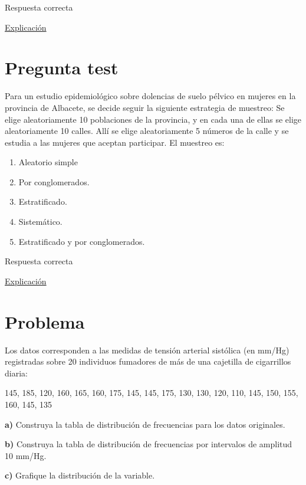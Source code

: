 \documentclass[
]{book}
\providecommand{\tightlist}{%
  \setlength{\itemsep}{0pt}\setlength{\parskip}{0pt}}
\begin{document}
Respuesta correcta

\href{https://es.wikipedia.org/wiki/Estudio_de_cohorte}{Explicación}

\hypertarget{pregunta-test-23}{%
\section{Pregunta test}\label{pregunta-test-23}}

Para un estudio epidemiológico sobre dolencias de suelo pélvico en mujeres en la provincia de Albacete, se decide seguir la siguiente estrategia de muestreo: Se elige aleatoriamente 10 poblaciones de la provincia, y en cada una de ellas se elige aleatoriamente 10 calles. Allí se elige aleatoriamente 5 números de la calle y se estudia a las mujeres que aceptan participar. El muestreo es:

\begin{enumerate}
\def\labelenumi{\alph{enumi})}
\tightlist
\item
  Aleatorio simple
\item
  Por conglomerados.
\item
  Estratificado.
\item
  Sistemático.
\item
  Estratificado y por conglomerados.
\end{enumerate}

Respuesta correcta

\href{https://1fjmanzano.github.io/bioestadistica/me\%CC\%81todos-de-muestreo.html}{Explicación}

\hypertarget{problema-4}{%
\section{Problema}\label{problema-4}}

Los datos corresponden a las medidas de tensión arterial sistólica (en mm/Hg) registradas sobre 20 individuos fumadores de más de una cajetilla de cigarrillos diaria:

145, 185, 120, 160, 165, 160, 175, 145, 145, 175, 130, 130, 120, 110, 145, 150, 155, 160, 145, 135

\textbf{a)} Construya la tabla de distribución de frecuencias para los datos originales.

\textbf{b)} Construya la tabla de distribución de frecuencias por intervalos de amplitud 10 mm/Hg.

\textbf{c)} Grafique la distribución de la variable.
\end{document}
